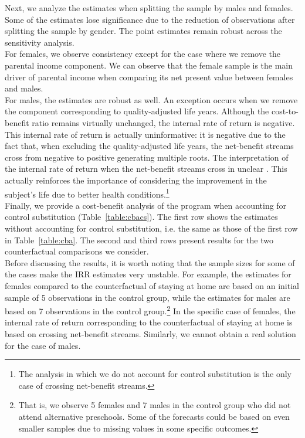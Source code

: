 \noindent Next, we analyze the estimates when splitting the sample by males and females. Some of the estimates lose significance due to the reduction of observations after splitting the sample by gender. The point estimates remain robust across  the sensitivity analysis.\\

\noindent For females, we observe consistency except for the case where we remove the parental income component. We can observe that the female sample is the main driver of parental income when comparing its net present value between females and males.\\

\noindent For males, the estimates are robust as well. An exception occurs when we remove the component corresponding to quality-adjusted life years. Although the cost-to-benefit ratio remains virtually unchanged, the internal rate of return is negative. This internal rate of return is actually uninformative: it is negative due to the fact that, when excluding the quality-adjusted life years, the net-benefit streams cross from negative to positive generating multiple roots. The interpretation of the internal rate of return when the net-benefit streams cross in unclear \citep{Arrow-Levhari_1969_EJ}. This actually reinforces the importance of considering the improvement in the subject's life due to better health conditions.\footnote{The analysis in which we do not account for control substitution is the only case of crossing net-benefit streams.}\\

\noindent Finally, we provide a cost-benefit analysis of the program when accounting for control substitution (Table~\ref{table:cbacs}). The first row shows the estimates without accounting for control substitution, i.e. the same as those of the first row in Table~\ref{table:cba}. The second and third rows present results for the two counterfactual comparisons we consider.\\ 

\noindent Before discussing the results, it is worth noting that the sample sizes for some of the cases make the IRR estimates very unstable. For example, the estimates for females compared to the counterfactual of staying at home are based on an initial sample of 5 observations in the control group, while the estimates for males are based on 7  observations in the control group.\footnote{That is, we observe 5 females and 7 males in the control group who did not attend alternative preschools. Some of the forecasts could be based on even smaller samples due to missing values in some specific outcomes.} In the specific case of females, the internal rate of return corresponding to the counterfactual of staying at home is based on crossing net-benefit streams. Similarly, we cannot obtain a real solution for the case of males.\\ 

